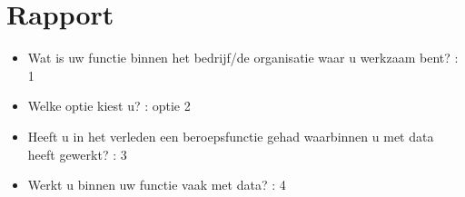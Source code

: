 \documentclass{article}
\begin{document}
\section{Rapport}
\begin{itemize}
  \item Wat is uw functie binnen het bedrijf/de organisatie waar u werkzaam bent? : 1
  \item Welke optie kiest u? : optie 2
  \item Heeft u in het verleden een beroepsfunctie gehad waarbinnen u met data heeft gewerkt? : 3
  \item Werkt u binnen uw functie vaak met data? : 4
\end{itemize}
\end{document}

